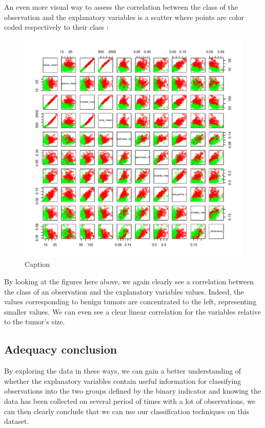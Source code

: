 An even more visual way to assess the correlation between the class of the observation and the explanatory variables is a scatter where points are color coded respectively to their class :

\begin{figure}[H]
    \centering
    \includegraphics[width=.55\textwidth]{figs/q1_pairs.pdf}
    \caption{Caption}
    \label{fig:scatterplot}
\end{figure}

By looking at the figures here above, we again clearly see a correlation between the class of an observation and the explanatory variables values. Indeed, the values corresponding to benign tumors are concentrated to the left, representing smaller values. We can even see a clear linear correlation for the variables relative to the tumor's size. 


\subsection{Adequacy conclusion}
By exploring the data in these ways, we can gain a better understanding of whether the explanatory variables contain useful information for classifying observations into the two groups defined by the binary indicator and knowing the data has been collected on several period of times with a lot of observations, we can then clearly conclude that we can use our classification techniques on this dataset.